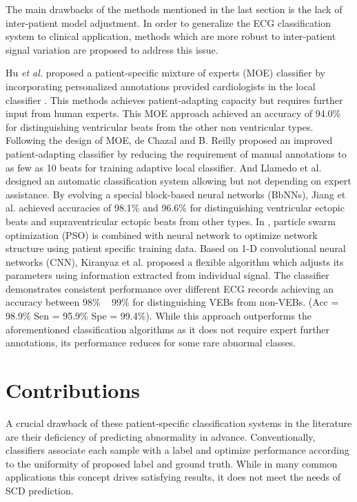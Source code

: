 The main drawbacks of the methods mentioned in the last section is the lack of inter-patient model adjustment. In order to generalize the ECG classification system to clinical application, methods which are more robust to inter-patient signal variation are proposed to address this issue\cite{Hu_et_al,deChazal2006,llamedo2012automatic,bbnn,ince2009generic,Kiranyaz}.

Hu \textit{et al.} proposed a patient-specific mixture of experts (MOE) classifier by incorporating personalized annotations provided cardiologists in the local classifier \cite{Hu_et_al}. This methods achieves patient-adapting capacity but requires further input from human experts. This MOE approach achieved an accuracy of 94.0\% for distinguishing ventricular beats from the other non ventricular types. Following the design of MOE, de Chazal and B. Reilly proposed an improved patient-adapting classifier by reducing the requirement of manual annotations to as few as 10 beats for training adaptive local classifier\cite{deChazal2006}. And Llamedo et al. designed an automatic classification system allowing but not depending on expert assistance\cite{llamedo2012automatic}. By evolving a special block-based neural networks (BbNNs), Jiang et al. achieved accuracies of 98.1\% and 96.6\% for distinguishing ventricular ectopic beats and supraventricular ectopic beats from other types\cite{bbnn}. In \cite{ince2009generic}, particle swarm optimization (PSO) is combined with neural network to optimize network structure using patient specific training data. Based on 1-D convolutional neural networks (CNN), Kiranyaz et al. proposed a flexible algorithm which adjusts its parameters using information extracted from individual signal\cite{Kiranyaz}. The classifier demonstrates consistent performance over different ECG records achieving an accuracy between 98\% ~ 99\% for distinguishing VEBs from non-VEBs. (Acc = 98.9\%  Sen = 95.9\% Spe =  99.4\%). While this approach outperforms the aforementioned classification algorithms as it does not require expert further annotations, its performance reduces for some rare abnormal classes. 
 
\section{Contributions}

A crucial drawback of these patient-specific classification systems in the literature are their deficiency of predicting abnormality in advance. Conventionally, classifiers associate each sample with a label and optimize performance according to the uniformity of proposed label and ground truth. While in many common applications this concept drives satisfying results, it does not meet the needs of SCD prediction. %

